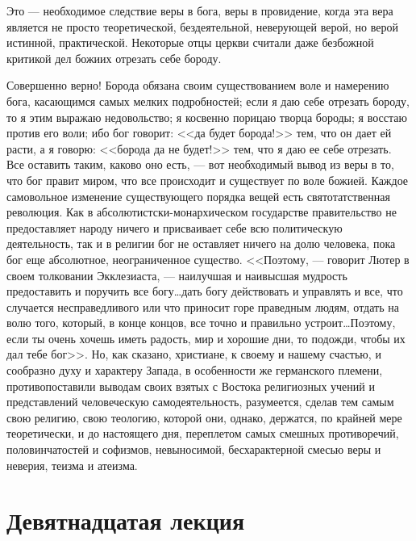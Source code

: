 \documentclass[12pt]{article}
\begin{document}
Это --- необходимое следствие веры в бога, веры в провидение, когда эта вера является не просто теоретической, бездеятельной, неверующей верой, но верой истинной, практической. Некоторые отцы церкви считали даже безбожной критикой дел божиих отрезать себе бороду. 

Совершенно верно! Борода обязана своим существованием воле и намерению бога, касающимся самых мелких подробностей; если я даю себе отрезать бороду, то я этим выражаю недовольство; я косвенно порицаю творца бороды; я восстаю против его воли; ибо бог говорит: <<да будет борода!>> тем, что он дает ей расти, а я говорю: <<борода да не будет!>> тем, что я даю ее себе отрезать. Все оставить таким, каково оно есть, --- вот необходимый вывод из веры в то, что бог правит миром, что все происходит и существует по воле божией. Каждое самовольное изменение существующего порядка вещей есть святотатственная революция. Как в абсолютистски-монархическом государстве правительство не предоставляет народу ничего и присваивает себе всю политическую деятельность, так и в религии бог не оставляет ничего на долю человека, пока бог еще абсолютное, неограниченное существо. <<Поэтому, --- говорит Лютер в своем толковании Экклезиаста, --- наилучшая и наивысшая мудрость предоставить и поручить все богу\dots дать богу действовать и управлять и все, что случается несправедливого или что приносит горе праведным людям, отдать на волю того, который, в конце концов, все точно и правильно устроит\dots Поэтому, если ты очень хочешь иметь радость, мир и хорошие дни, то подожди, чтобы их дал тебе бог>>. Но, как сказано, христиане, к своему и нашему счастью, и сообразно духу и характеру Запада, в особенности же германского племени, противопоставили выводам своих взятых с Востока религиозных учений и представлений человеческую самодеятельность, разумеется, сделав тем самым свою религию, свою теологию, которой они, однако, держатся, по крайней мере теоретически, и до настоящего дня, переплетом самых смешных противоречий, половинчатостей и софизмов, невыносимой, бесхарактерной смесью веры и неверия, теизма и атеизма. 

{}
\section*{Девятнадцатая лекция}
\end{document}
